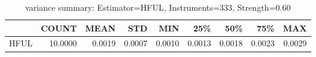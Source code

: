 \begin{table}[ht]
\centering
\caption{variance summary: Estimator=HFUL, Instruments=333, Strength=0.60}
\begin{tabular}{lrrrrrrrr}
\toprule
 & COUNT & MEAN & STD & MIN & 25\% & 50\% & 75\% & MAX \\
\midrule
HFUL & 10.0000 & 0.0019 & 0.0007 & 0.0010 & 0.0013 & 0.0018 & 0.0023 & 0.0029 \\
\bottomrule
\end{tabular}
\end{table}
